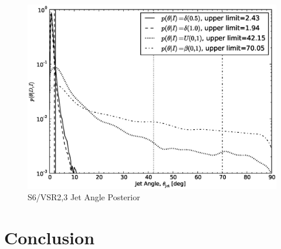 \documentclass[twocolumn,nofootinbib]{revtex4-1}
\begin{document}
\begin{figure}
\centering
\includegraphics[width=\linewidth]{jet_angle_posterior_iligo.eps}
\caption{S6/VSR2,3 Jet Angle Posterior\label{fig:s6angle}}
\end{figure}

\section{Conclusion}
\end{document}
